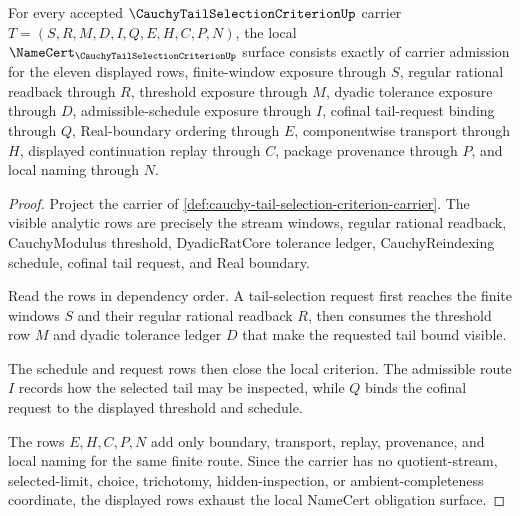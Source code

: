 \begin{theorem}
\label{thm:cauchy-tail-selection-criterion-namecert-obligations}
For every accepted $\CauchyTailSelectionCriterionUp$ carrier $T=(S,R,M,D,I,Q,E,H,C,P,N)$, the local $\NameCert_{\CauchyTailSelectionCriterionUp}$ surface consists exactly of carrier admission for the eleven displayed rows, finite-window exposure through $S$, regular rational readback through $R$, threshold exposure through $M$, dyadic tolerance exposure through $D$, admissible-schedule exposure through $I$, cofinal tail-request binding through $Q$, Real-boundary ordering through $E$, componentwise transport through $H$, displayed continuation replay through $C$, package provenance through $P$, and local naming through $N$.
\end{theorem}
\begin{proof}
Project the carrier of \autoref{def:cauchy-tail-selection-criterion-carrier}. The visible analytic rows are precisely the stream windows, regular rational readback, CauchyModulus threshold, DyadicRatCore tolerance ledger, CauchyReindexing schedule, cofinal tail request, and Real boundary.

Read the rows in dependency order. A tail-selection request first reaches the finite windows $S$ and their regular rational readback $R$, then consumes the threshold row $M$ and dyadic tolerance ledger $D$ that make the requested tail bound visible.

The schedule and request rows then close the local criterion. The admissible route $I$ records how the selected tail may be inspected, while $Q$ binds the cofinal request to the displayed threshold and schedule.

The rows $E,H,C,P,N$ add only boundary, transport, replay, provenance, and local naming for the same finite route. Since the carrier has no quotient-stream, selected-limit, choice, trichotomy, hidden-inspection, or ambient-completeness coordinate, the displayed rows exhaust the local NameCert obligation surface.
\end{proof}

